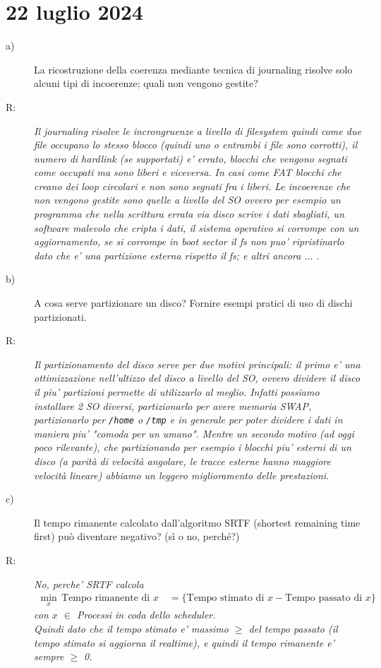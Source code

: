 \documentclass[a4paper,12pt]{article}
\newcommand{\datasection}[1]{%
    \section*{#1}%
    \addcontentsline{toc}{section}{#1}%
}
\newenvironment{exambox}{%
    \begin{mdframed}[
        linecolor=black!70,
        linewidth=0.6pt,
        innerleftmargin=8pt,
        innerrightmargin=8pt,
        innertopmargin=6pt,
        innerbottommargin=6pt
    ]
    \begin{description}
}{%
    \end{description}
    \end{mdframed}
}
\begin{document}
\newpage
\datasection{22 luglio 2024}
\begin{exambox}
\item[a)] La ricostruzione della coerenza mediante tecnica di journaling risolve solo alcuni tipi di incoerenze; quali non vengono gestite?
\item[R:] \textit{Il journaling risolve le incrongruenze a livello di filesystem quindi come due file occupano lo stesso blocco (quindi uno o entrambi i file sono corrotti), il numero di hardlink (se supportati) e' errato, blocchi che vengono segnati come occupati ma sono liberi e viceversa. In casi come FAT blocchi che creano dei loop circolari e non sono segnati fra i liberi. Le incoerenze che non vengono gestite sono quelle a livello del SO ovvero per esempio un programma che nella scrittura errata via disco scrive i dati sbagliati, un software malevolo che cripta i dati, il sistema operativo si corrompe con un aggiornamento, se si corrompe in boot sector il fs non puo' ripristinarlo dato che e' una partizione esterna rispetto il fs; e altri ancora $\dots$ .}
\item[b)] A cosa serve partizionare un disco? Fornire esempi pratici di uso di dischi partizionati.
\item[R:] \textit{Il partizionamento del disco serve per due motivi principali: il primo e' una ottimizzazione nell'ultizzo del disco a livello del SO, ovvero dividere il disco il piu' partizioni permette di utilizzarlo al meglio. Infatti possiamo installare 2 SO diversi, partizionarlo per avere memoria SWAP, partizionarlo per \texttt{/home} o \texttt{/tmp} e in generale per poter dividere i dati in maniera piu' "comoda per un umano". Mentre un secondo motivo (ad oggi poco rilevante), che partizionando per esempio i blocchi piu' esterni di un disco (a parità di velocità angolare, le tracce esterne hanno maggiore velocità lineare) abbiamo un leggero miglioramento delle prestazioni.}
\item[c)] Il tempo rimanente calcolato dall'algoritmo SRTF (shortest remaining time first) può diventare negativo? (sì o no, perché?)
\item[R:] \textit{No, perche' SRTF calcola
\begin{align*}
    \min_{x} \, \text{Tempo rimanente di $x$} \quad = \{\text{Tempo stimato di $x$} - \text{Tempo passato di $x$}\}
\end{align*}
con $x$ $\in$ Processi in coda dello scheduler.\\
Quindi dato che il tempo stimato e' massimo $\geq$ del tempo passato (il tempo stimato si aggiorna il realtime), e quindi il tempo rimanente e' sempre $\geq$ 0.
}
\end{exambox}
\end{document}
